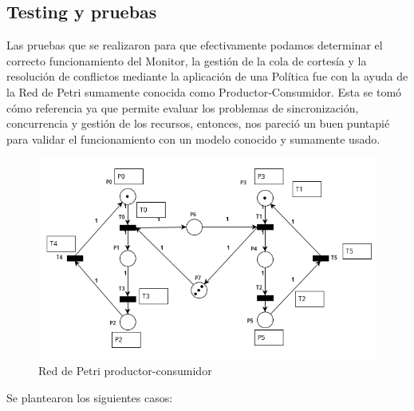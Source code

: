 \subsection{Testing y pruebas} \mbox{} \vspace{5pt}

Las pruebas que se realizaron para que efectivamente podamos determinar el correcto funcionamiento del Monitor, la gestión de la cola de cortesía y la resolución de conflictos mediante la aplicación de una Política fue con la ayuda de la Red de Petri sumamente conocida como Productor-Consumidor. Esta se tomó cómo referencia ya que permite evaluar los problemas de sincronización, concurrencia y gestión de los recursos, entonces, nos pareció un buen puntapié para validar el funcionamiento con un modelo conocido y sumamente usado.

\begin{figure}[H]
   \centering
   \includegraphics[width=0.9\linewidth]{images/rdp_prod_cons.png}
   \caption{Red de Petri productor-consumidor}
   \label{fig:rdp_prod_cons}
\end{figure}

Se plantearon los siguientes casos:

